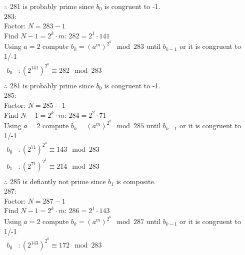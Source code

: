 \documentclass[fleqn, 12pt]{article}
\begin{document}
\begin{enumerate}[a)]
        $\therefore$ 281 is probably prime since $b_0$ is congruent to -1.\\

        283:\\

        Factor: $N = 283-1$\\
        Find $N-1=2^k \cdot m$: $282=2^1 \cdot 141$\\
        Using $a=2$ compute $b_k={(a^m)}^{2^k} \mod 283$ until $b_{k-1}$ or it is congruent to 1/-1\\

        $
            \begin{aligned}
                b_0 &: (2^{141})^{2^0} \equiv 282 \mod 283\\
            \end{aligned}
        $\\

        $\therefore$ 281 is probably prime since $b_0$ is congruent to -1.\\

        285:\\

        Factor: $N = 285-1$\\
        Find $N-1=2^k \cdot m$: $284=2^2 \cdot 71$\\
        Using $a=2$ compute $b_k={(a^m)}^{2^k} \mod 285$ until $b_{k-1}$ or it is congruent to 1/-1\\

        $
            \begin{aligned}
                b_0 &: (2^{71})^{2^0} \equiv 143 \mod 283\\
                b_1 &: (2^{71})^{2^1} \equiv 214 \mod 283\\
            \end{aligned}
        $\\

        $\therefore$ 285 is defiantly not prime since $b_1$ is composite.\\

        287:\\

        Factor: $N = 287-1$\\
        Find $N-1=2^k \cdot m$: $286=2^1 \cdot 143$\\
        Using $a=2$ compute $b_k={(a^m)}^{2^k} \mod 287$ until $b_{k-1}$ or it is congruent to 1/-1\\

        $
            \begin{aligned}
                b_0 &: (2^{143})^{2^0} \equiv 172 \mod 283\\
            \end{aligned}
        $\\


\end{enumerate}
\end{document}
